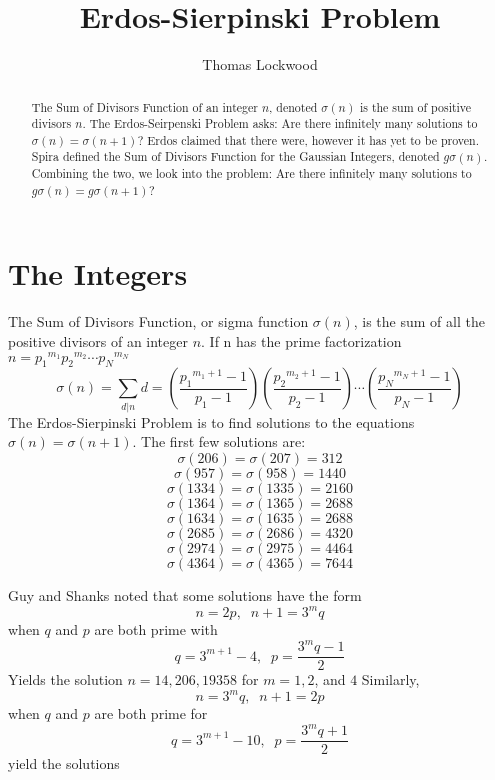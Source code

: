 \documentclass[12pt]{amsart}
\title{Erdos-Sierpinski Problem}
\author{Thomas Lockwood}
\begin{document}
\maketitle
\thispagestyle{empty}
\begin{abstract}
The Sum of Divisors Function of an integer $n$, denoted $\sigma(n)$ is the sum of positive divisors $n$. The Erdos-Seirpenski Problem asks: Are there infinitely many solutions to $\sigma(n) = \sigma(n+1)$? Erdos claimed that there were, however it has yet to be proven. Spira defined the Sum of Divisors Function for the Gaussian Integers, denoted $g\sigma(n)$. Combining the two, we look into the problem: Are there infinitely many solutions to $g\sigma(n) = g\sigma(n+1)$?
\end{abstract}

\section{The Integers}
The Sum of Divisors Function, or sigma function $\sigma(n)$, is the sum of all the positive divisors of an integer $n$. If n has the prime factorization $n = {p_1}^{m_1}{p_2}^{m_2}\cdots{p_N}^{m_N}$ $$\sigma(n) = \sum_{d|{n}}d = \left(\frac{{p_1}^{m_1+1} - 1} {{p_1} - 1}\right) \left(\frac{{p_2}^{m_2+1} - 1}{{p_2} - 1}\right)\cdots \left(\frac{{p_N}^{m_N+1} - 1}{{p_N} - 1}\right) $$ 
The Erdos-Sierpinski Problem is to find solutions to the equations $\sigma(n) = \sigma(n+1)$. The first few solutions are:
$$\sigma(206) = \sigma(207) = 312$$
$$\sigma(957) = \sigma(958) = 1440$$
$$\sigma(1334) = \sigma(1335) = 2160$$
$$\sigma(1364) = \sigma(1365) = 2688$$
$$\sigma(1634) = \sigma(1635) = 2688$$
$$\sigma(2685) = \sigma(2686) = 4320$$
$$\sigma(2974) = \sigma(2975) = 4464$$
$$\sigma(4364) = \sigma(4365) = 7644$$

Guy and Shanks noted that some solutions have the form $$n = 2p,\; \; n + 1 = 3^{m}q$$ when $q$ and $p$ are both prime with $$q = 3^{m+1} - 4, \; \; p=\frac{3^{m}q-1} {2}$$ Yields the solution $n = 14, 206, 19358$ for $m=1,2$, and $4$
Similarly, $$n = 3^{m}q, \; \; n+1 = 2p$$ when $q$ and $p$ are both prime for $$q = 3^{m+1} - 10, \; \; p = \frac{3^{m}q + 1} {2}$$  yield the solutions %

\end{document}
